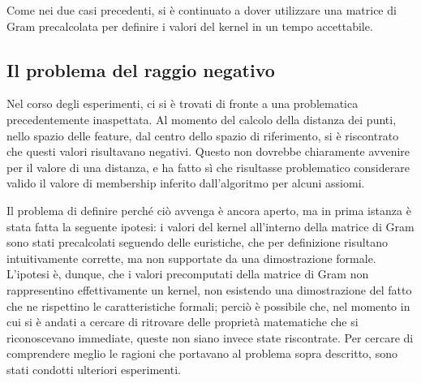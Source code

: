 \documentclass[12pt,a4paper]{report}
\begin{document}
Come nei due casi precedenti, si è continuato a dover utilizzare una matrice di Gram precalcolata per definire i valori del kernel in un tempo accettabile.

\subsection{Il problema del raggio negativo}

Nel corso degli esperimenti, ci si è trovati di fronte a una problematica precedentemente inaspettata. 
Al momento del calcolo della distanza dei punti, nello spazio delle feature, dal centro dello spazio di riferimento, si è riscontrato che questi valori risultavano negativi. Questo non dovrebbe chiaramente avvenire per il valore di una distanza, e ha fatto sì che risultasse problematico considerare valido il valore di membership inferito dall'algoritmo per alcuni assiomi.

Il problema di definire perché ciò avvenga è ancora aperto, ma in prima istanza è stata fatta la seguente ipotesi: i valori del kernel all'interno della matrice di Gram sono stati precalcolati seguendo delle euristiche, che per definizione risultano intuitivamente corrette, ma non supportate da una dimostrazione formale. L'ipotesi è, dunque, che i valori precomputati della matrice di Gram non rappresentino effettivamente un kernel, non esistendo una dimostrazione del fatto che ne  rispettino le caratteristiche formali; perciò è possibile che, nel momento in cui si è andati a cercare di ritrovare delle proprietà matematiche che si riconoscevano immediate, queste non siano invece state riscontrate. 
Per cercare di comprendere meglio le ragioni che portavano al problema sopra descritto, sono stati condotti ulteriori esperimenti.
\end{document}
